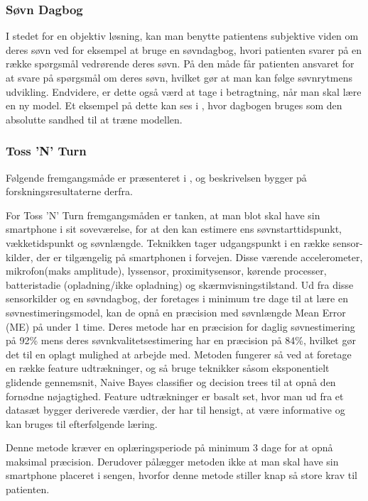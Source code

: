 \subsubsection{Søvn Dagbog}
I stedet for en objektiv løsning, kan man benytte patientens subjektive viden om deres søvn ved for eksempel at bruge en søvndagbog, hvori patienten svarer på en række spørgsmål vedrørende deres søvn. 
På den måde får patienten ansvaret for at svare på spørgsmål om deres søvn, hvilket gør at man kan følge søvnrytmens udvikling.
Endvidere, er dette også værd at tage i betragtning, når man skal lære en ny model. 
Et eksempel på dette kan ses i \citet{Min:2014:TNT:2556288.2557220}, hvor dagbogen bruges som den absolutte sandhed til at træne modellen.

\subsubsection{Toss 'N' Turn}\label{sec:tossNturn}
Følgende fremgangsmåde er præsenteret i \citet{Min:2014:TNT:2556288.2557220}, og beskrivelsen bygger på forskningsresultaterne derfra.

For Toss 'N' Turn fremgangsmåden er tanken, at man blot skal have sin smartphone i sit soveværelse, for at den kan estimere ens søvnstarttidspunkt, vækketidspunkt og søvnlængde.
Teknikken tager udgangspunkt i en række sensor-kilder, der er tilgængelig på smartphonen i forvejen.
Disse værende accelerometer, mikrofon(maks amplitude), lyssensor, proximitysensor, kørende processer, batteristadie (opladning/ikke opladning) og skærmvisningstilstand.
Ud fra disse sensorkilder og en søvndagbog, der foretages i minimum tre dage til at lære en søvnestimeringsmodel, kan de opnå en præcision med søvnlængde Mean Error (ME) på under 1 time.
Deres metode har en præcision for daglig søvnestimering på 92\% mens deres søvnkvalitetsestimering har en præcision på 84\%, hvilket gør det til en oplagt mulighed at arbejde med.
Metoden fungerer så ved at foretage en række feature udtrækninger, og så bruge teknikker såsom eksponentielt glidende gennemsnit, Naive Bayes classifier og decision trees til at opnå den fornødne nøjagtighed.
Feature udtrækninger er basalt set, hvor man ud fra et datasæt bygger deriverede værdier, der har til hensigt, at være informative og kan bruges til efterfølgende læring.

Denne metode kræver en oplæringsperiode på minimum 3 dage for at opnå maksimal præcision.
Derudover pålægger metoden ikke at man skal have sin smartphone placeret i sengen, hvorfor denne metode stiller knap så store krav til patienten.

